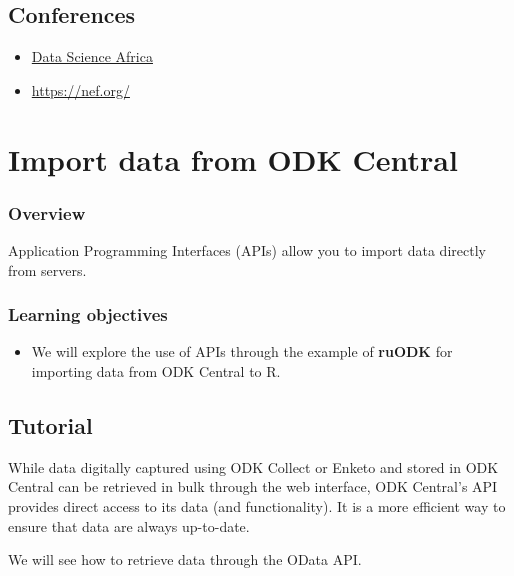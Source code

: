 \documentclass[
  letterpaper,
  DIV=11,
  numbers=noendperiod,
  oneside]{scrreprt}
\providecommand{\tightlist}{%
  \setlength{\itemsep}{0pt}\setlength{\parskip}{0pt}}\usepackage{longtable,booktabs,array}
\begin{document}
\hypertarget{conferences-1}{%
\section{Conferences}\label{conferences-1}}

\begin{itemize}
\item
  \href{http://www.datascienceafrica.org/}{Data Science Africa}
\item
  \url{https://nef.org/}
\end{itemize}

\hypertarget{import-data-from-odk-central}{%
\chapter{Import data from ODK
Central}\label{import-data-from-odk-central}}

\hypertarget{overview-11}{%
\subsection{Overview}\label{overview-11}}

Application Programming Interfaces (APIs) allow you to import data
directly from servers.

\hypertarget{learning-objectives-11}{%
\subsection{Learning objectives}\label{learning-objectives-11}}

\begin{itemize}
\tightlist
\item
  We will explore the use of APIs through the example of \textbf{ruODK}
  for importing data from ODK Central to R.
\end{itemize}

\hypertarget{tutorial}{%
\section{Tutorial}\label{tutorial}}

While data digitally captured using ODK Collect or Enketo and stored in
ODK Central can be retrieved in bulk through the web interface, ODK
Central's API provides direct access to its data (and functionality). It
is a more efficient way to ensure that data are always up-to-date.

We will see how to retrieve data through the OData API.
\end{document}
